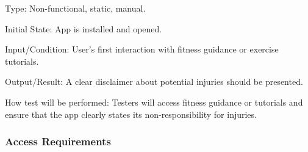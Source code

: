 \documentclass[12pt, titlepage]{article}
\begin{document}
\begin{enumerate}
        Type: Non-functional, static, manual.

        Initial State: App is installed and opened.

        Input/Condition: User's first interaction with fitness guidance or exercise tutorials.

        Output/Result: A clear disclaimer about potential injuries should be presented.

        How test will be performed: Testers will access fitness guidance or tutorials and ensure that the app clearly states its non-responsibility for injuries.

    \end{enumerate}


    \subsubsection{Access Requirements}
\end{document}

